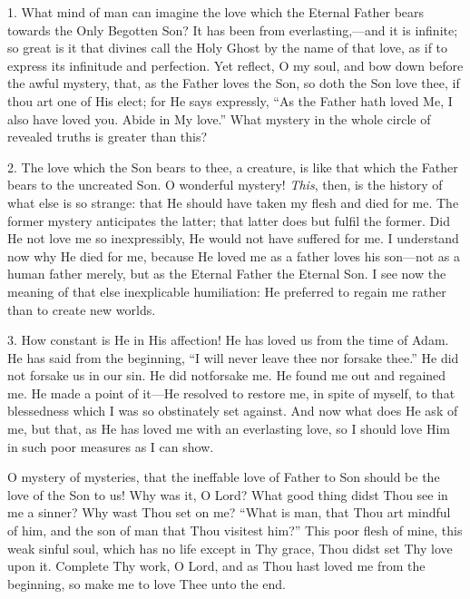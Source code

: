 1. What mind of man can imagine
the love which the Eternal Father bears towards the Only Begotten Son?
It has been from everlasting,—and it is infinite; so great is it that
divines call the Holy Ghost by the name of that love, as if to express
its infinitude and perfection. Yet reflect, O my soul, and bow down
before the awful mystery, that, as the Father loves the Son, so doth the
Son love thee, if thou art one of His elect; for He says expressly, ``As
the Father hath loved Me, I also have loved you. Abide in My love.'' What
mystery in the whole circle of revealed truths is greater than this?

2. The love which the Son bears
to thee, a creature, is like that which the Father bears to the
uncreated Son. O wonderful mystery! \emph{This}, then, is the history of
what else is so strange: that He should have taken my flesh and
died for me. The former mystery anticipates the latter; that latter does
but fulfil the former. Did He not love me so inexpressibly, He would not
have suffered for me. I understand now why He died for me, because He
loved me as a father loves his son—not as a human father merely, but
as the Eternal Father the Eternal Son. I see now the meaning of that
else inexplicable humiliation: He preferred to regain me rather than to
create new worlds.

3. How constant is He in His
affection! He has loved us from the time of Adam. He has said from the
beginning, ``I will never leave thee nor forsake thee.'' He did not
forsake us in our sin. He did not\emph{}forsake me. He found me out and
regained me. He made a point of it—He resolved to restore me, in spite
of myself, to that blessedness which I was so obstinately set against.
And now what does He ask of me, but that, as He has loved me with an
everlasting love, so I should love Him in such poor measures as I can
show.

O mystery of mysteries, that the
ineffable love of Father to Son should be the love of the Son to us! Why
was it, O Lord? What good thing didst Thou see in me a sinner? Why wast
Thou set on me? ``What is man, that Thou art mindful of him, and the son
of man that Thou visitest him?'' This poor flesh of mine, this weak
sinful soul, which has no life except in Thy grace, Thou didst set Thy
love upon it. Complete Thy work, O Lord, and as Thou hast loved me from
the beginning, so make me to love Thee unto the end.



